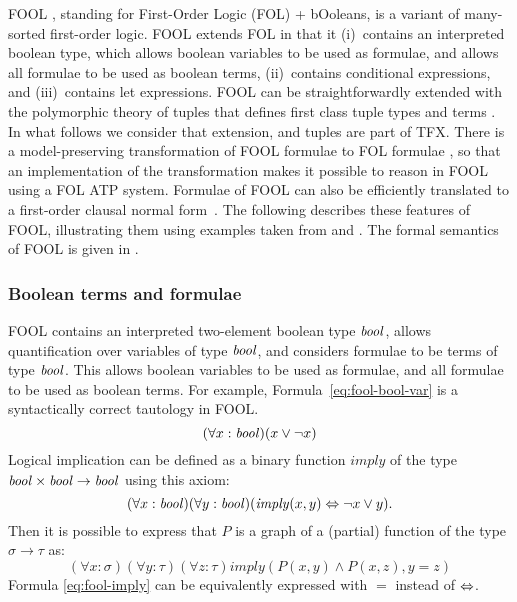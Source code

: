 \documentclass{easychair}
\begin{document}
FOOL \cite{KKV15}, standing for First-Order Logic (FOL) + bOoleans, is a 
variant of many-sorted first-order logic. 
FOOL extends FOL in that it (i)~contains an interpreted boolean type, which
allows boolean variables to be used as formulae, and allows all formulae to be 
used as boolean terms, (ii)~contains conditional expressions, and 
(iii)~contains let expressions.
FOOL can be straightforwardly extended with the polymorphic theory of tuples 
that defines first class tuple types and terms \cite{KKV18}.
In what follows we consider that extension, and tuples are part of TFX.
There is a model-preserving transformation of FOOL formulae to FOL formulae
\cite{KKV15}, so that an implementation of the transformation makes it 
possible to reason in FOOL using a FOL ATP system.
Formulae of FOOL can also be efficiently translated to a first-order clausal 
normal form~\cite{KK+16-GCAI}. 
The following describes these features of FOOL, illustrating them using 
examples taken from \cite{KK+16} and \cite{KKV18}.
The formal semantics of FOOL is given in \cite{KKV15}.

\subsubsection{Boolean terms and formulae}

FOOL contains an interpreted two-element boolean type $\mathit{bool}$, allows 
quantification over variables of type $\mathit{bool}$, and considers formulae to 
be terms of type $\mathit{bool}$.
This allows boolean variables to be used as formulae, and all formulae to be 
used as boolean terms.
For example, Formula~\ref{eq:fool-bool-var} is a syntactically correct 
tautology in FOOL.
\begin{equation}\label{eq:fool-bool-var}
(\forall x:\mathit{bool})(x \lor \neg x)
\end{equation}
Logical implication can be defined as a binary function
$\mathit{imply}$ of the type $\mathit{bool} \times \mathit{bool} \to \mathit{bool}$ using this axiom:
\begin{equation}\label{eq:fool-imply}
(\forall x:\mathit{bool})(\forall y:\mathit{bool})(\mathit{imply}(x,y) \Leftrightarrow \neg x \lor y).
\end{equation}
Then it is possible to express that $P$ is a graph of a (partial) function of 
the type $\sigma \to \tau$ as:
\begin{equation}\label{eq:bool-arg-example}
(\forall x:\sigma)(\forall y:\tau)(\forall z:\tau)
\mathit{imply}(P(x,y) \land P(x,z), y = z)
\end{equation}
Formula \ref{eq:fool-imply} can be equivalently expressed with $=$ instead of
$\Leftrightarrow$.
\end{document}
